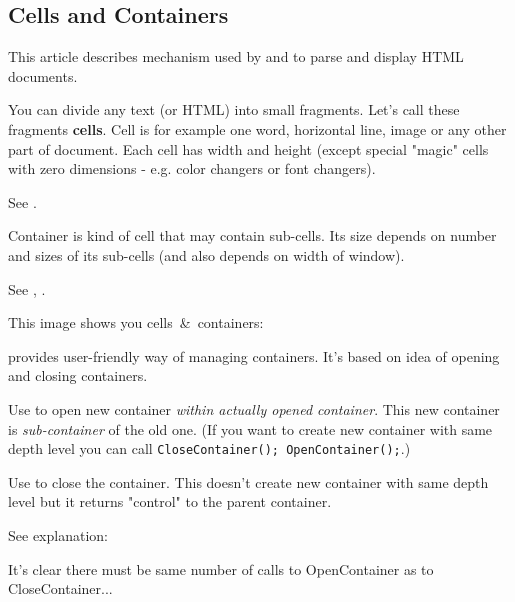 \subsection{Cells and Containers}\label{cells}

This article describes mechanism used by 
 and
to parse and display HTML documents.


You can divide any text (or HTML) into small fragments. Let's call these
fragments {\bf cells}. Cell is for example one word, horizontal line, image
or any other part of document. Each cell has width and height (except special
"magic" cells with zero dimensions - e.g. color changers or font changers).

See .


Container is kind of cell that may contain sub-cells. Its size depends
on number and sizes of its sub-cells (and also depends on width of window). 

See , 
.

This image shows you cells\ &\ containers:



 provides user-friendly way
of managing containers. It's based on idea of opening and closing containers.

Use  to open new
container {\it within actually opened container}. This new container is 
{\it sub-container} of the old one. (If you want to create new container with
same depth level you can call {\tt CloseContainer(); OpenContainer();}.)

Use  to close the 
container. This doesn't create new container with same depth level but
it returns "control" to the parent container.

See explanation:


It's clear there must be same number of calls to 
OpenContainer as to CloseContainer...


